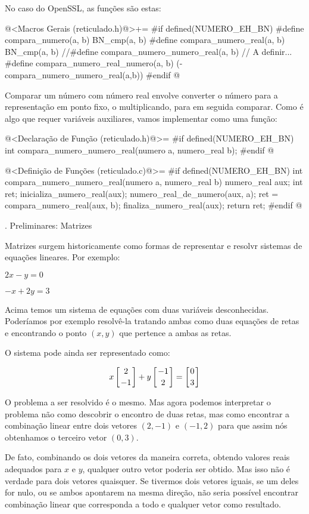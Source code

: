 No caso do OpenSSL, as funções são estas:

\iniciocodigo
@<Macros Gerais (reticulado.h)@>+=
#if defined(NUMERO_EH_BN)
#define compara_numero(a, b) BN_cmp(a, b)
#define compara_numero_real(a, b) BN_cmp(a, b)
//#define compara_numero_numero_real(a, b) // A definir...
#define compara_numero_real_numero(a, b) (-compara_numero_numero_real(a,b))
#endif
@
\fimcodigo

Comparar um número com número real envolve converter o número para a
representação em ponto fixo, o multiplicando, para em seguida
comparar. Como é algo que requer variáveis auxiliares, vamos
implementar como uma função:

\iniciocodigo
@<Declaração de Função (reticulado.h)@>=
#if defined(NUMERO_EH_BN)
int compara_numero_numero_real(numero a, numero_real b);
#endif
@
\fimcodigo

\iniciocodigo
@<Definição de Funções (reticulado.c)@>=
#if defined(NUMERO_EH_BN)
int compara_numero_numero_real(numero a, numero_real b){
  numero_real aux;
  int ret;
  inicializa_numero_real(aux);
  numero_real_de_numero(aux, a);
  ret = compara_numero_real(aux, b);
  finaliza_numero_real(aux);
  return ret;
}
#endif
@

{\twelvebold {}. Preliminares: Matrizes}

Matrizes surgem historicamente como formas de representar e resolvr
sistemas de equações lineares. Por exemplo:

$2x-y=0$

$-x+2y=3$

Acima temos um sistema de equações com duas variáveis
desconhecidas. Poderíamos por exemplo resolvê-la tratando ambas como
duas equações de retas e encontrando o ponto $(x, y)$ que pertence a
ambas as retas.

O sistema pode ainda ser representado como:

$$x\left[{2\atop-1}\right]+y\left[-1\atop 2\right]=\left[0\atop3\right]$$

O problema a ser resolvido é o mesmo. Mas agora podemos interpretar o
problema não como descobrir o encontro de duas retas, mas como
encontrar a combinação linear entre dois vetores $(2, -1)$ e $(-1, 2)$
para que assim nós obtenhamos o terceiro vetor $(0, 3)$.

De fato, combinando os dois vetores da maneira correta, obtendo
valores reais adequados para $x$ e $y$, qualquer outro vetor poderia
ser obtido. Mas isso não é verdade para dois vetores quaisquer. Se
tivermos dois vetores iguais, se um deles for nulo, ou se ambos
apontarem na mesma direção, não seria possível encontrar combinação
linear que corresponda a todo e qualquer vetor como resultado.

